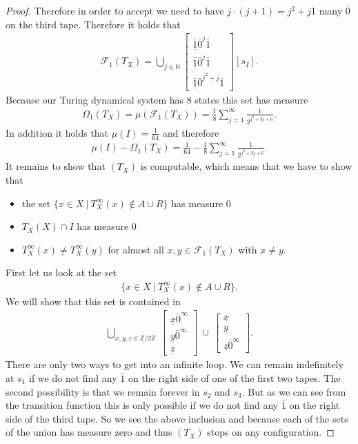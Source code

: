 \documentclass[12pt,a4paper]{scrartcl}
\theoremstyle{plain}
\theoremstyle{definition}
\newcommand{\N}{\mathbb{N}} %
\newcommand{\2}{\mathbb{Z} / 2 \mathbb{Z}}
\newcommand{\1}{\bar{1}}
\newcommand{\0}{\bar{0}}
\begin{document}
\begin{proof}
	Therefore in order to accept we need to have $j \cdot (j + 1) = j^2 + j$1 many $\0$ on the third tape. Therefore it holds that
	\begin{align*}
		\mathcal{F}_1(T_X) = \bigcup_{j \in \N}\begin{bmatrix}
	 		\underline{\1} \0^j \1 \\
	 		\underline{\1} \0^j \1 \\
	 		\underline{\1} \0^{j^2 + j} \1
		\end{bmatrix}[s_I].
	\end{align*}
	Because our Turing dynamical system  has $8$ states this set has measure 
	\begin{align*}
		\Omega_1(T_X) = \mu(\mathcal{F}_1(T_X)) = \frac{1}{8} \sum_{j = 1}^{\infty} \frac{1}{2^{j^2 + 3j + 6}}.
	\end{align*}
	In addition it holds that $\mu (I) = \frac{1}{64}$ and therefore 
	\begin{align*}
		\mu (I) - \Omega_1(T_X) = \frac{1}{64} - \frac{1}{8} \sum_{j = 1}^{\infty} \frac{1}{2^{j^2 + 3j + 6}}.
	\end{align*}
	It remains to show that $(T_X)$ is computable, which means that we have to show that
	\begin{itemize}
		\item the set $\{x \in X ~|~ T_X^\infty(x) \notin A \cup R\}$ has measure $0$
		\item $T_X(X) \cap I$ has measure $0$
		\item $T_X^\infty (x) \neq T_X^\infty (y)$ for almost all $x, y \in \mathcal{F}_1(T_X)$ with $x \neq y$.
	\end{itemize}
	First let us look at the set 
	\begin{align*}
		\{x \in X ~|~ T_X^\infty(x) \notin A \cup R\}.
	\end{align*}
	We will show that this set is contained in
	\begin{align*}
		\bigcup_{x,y,z \in \2} ~
		\begin{bmatrix}
			\underline{x} \0^\infty \\
			\underline{y} \0^\infty \\
			\underline{z}
		\end{bmatrix} \  \cup \
		\begin{bmatrix}
			\underline{x} \\
			\underline{y} \\
			\underline{z} \0^\infty
		\end{bmatrix}.
	\end{align*}
	There are only two ways to get into an infinite loop. We can remain indefinitely at $s_1$ if we do not find any $\1$ on the right side of one of the first two tapes. The second possibility is that we remain forever in $s_2$ and $s_3$. But as we can see from the transition function this is only possible if we do not find any $\1$ on the  right side of the third tape. So we see the above inclusion and because each of the sets of the union has measure zero and thus $(T_X)$ stops on any configuration. 


\end{proof}
\end{document}
